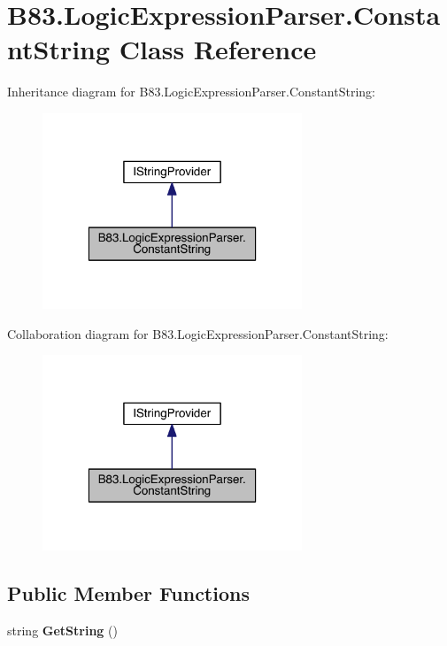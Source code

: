 \hypertarget{class_b83_1_1_logic_expression_parser_1_1_constant_string}{}\section{B83.\+Logic\+Expression\+Parser.\+Constant\+String Class Reference}
\label{class_b83_1_1_logic_expression_parser_1_1_constant_string}


Inheritance diagram for B83.\+Logic\+Expression\+Parser.\+Constant\+String\+:\nopagebreak
\begin{figure}[H]
\begin{center}
\leavevmode
\includegraphics[width=220pt]{class_b83_1_1_logic_expression_parser_1_1_constant_string__inherit__graph}
\end{center}
\end{figure}


Collaboration diagram for B83.\+Logic\+Expression\+Parser.\+Constant\+String\+:\nopagebreak
\begin{figure}[H]
\begin{center}
\leavevmode
\includegraphics[width=220pt]{class_b83_1_1_logic_expression_parser_1_1_constant_string__coll__graph}
\end{center}
\end{figure}
\subsection*{Public Member Functions}
\begin{DoxyCompactItemize}
\item 
string {\bfseries Get\+String} ()\hypertarget{class_b83_1_1_logic_expression_parser_1_1_constant_string_a35dec11c978c70df1bc7f5346e55ecea}{}\label{class_b83_1_1_logic_expression_parser_1_1_constant_string_a35dec11c978c70df1bc7f5346e55ecea}

\end{DoxyCompactItemize}
